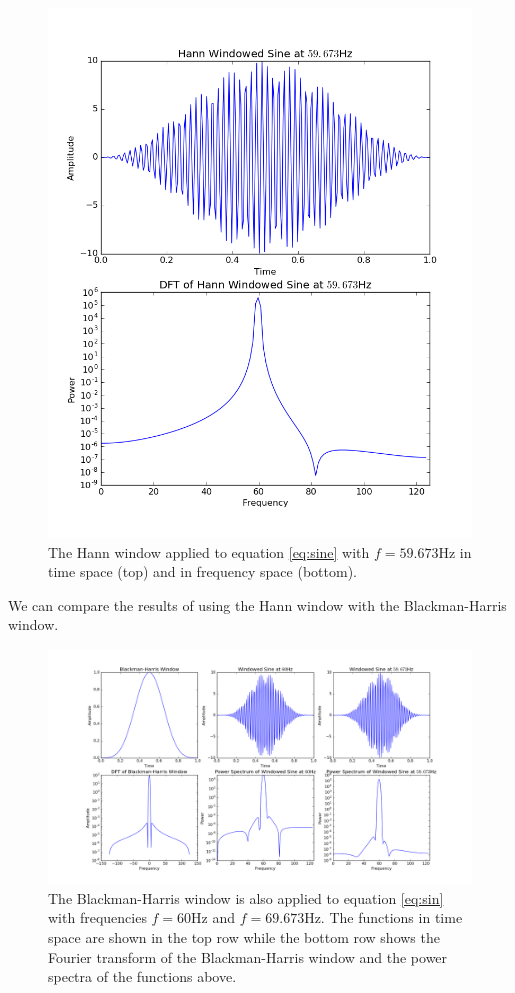 \message{ !name(austin_report.tex)}\documentclass[11pt, letterpage, twocolumn]{article}
\begin{document}
\begin{figure}
  \includegraphics[width=\linewidth]{hann_1.png}
  \caption{
    The Hann window applied to equation \ref{eq:sine} with $f = 59.673$Hz in
    time space (top) and in frequency space (bottom).
  }
  \label{fig:hann_1}
\end{figure}

We can compare the results of using the Hann window with the
Blackman-Harris window.

\begin{figure}
  \includegraphics[width=\linewidth]{blackman_harris.png}
  \caption{
    The Blackman-Harris window is also applied to equation \ref{eq:sin} with
    frequencies $f = 60$Hz and $f = 69.673$Hz. The functions in time space are
    shown in the top row while the bottom row shows the Fourier transform of the
    Blackman-Harris window and the power spectra of the functions above.
  }
  \label{fig:blackman_harris}
\end{figure}
\end{document}
